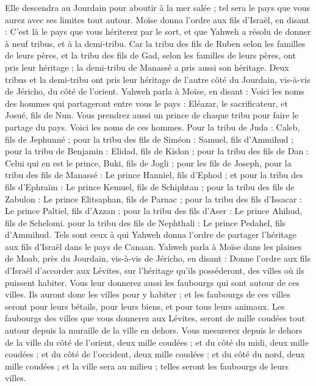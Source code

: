 \begin{multicols}{2}
Elle descendra au Jourdain pour aboutir à la mer salée ; tel sera le pays que vous aurez avec ses limites tout autour.
Moïse donna l'ordre aux fils d'Israël, en disant : C'est là le pays que vous hériterez par le sort, et que Yahweh a résolu de donner à neuf tribus, et à la demi-tribu.
Car la tribu des fils de Ruben selon les familles de leurs pères, et la tribu des fils de Gad, selon les familles de leurs pères, ont pris leur héritage ; la demi-tribu de Manassé a pris aussi son héritage.
Deux tribus et la demi-tribu ont pris leur héritage de l'autre côté du Jourdain, vis-à-vis de Jéricho, du côté de l'orient.
Yahweh parla à Moïse, en disant :
Voici les noms des hommes qui partageront entre vous le pays : Eléazar, le sacrificateur, et Josué, fils de Nun.
Vous prendrez aussi un prince de chaque tribu pour faire le partage du pays.
Voici les noms de ces hommes. Pour la tribu de Juda : Caleb, fils de Jephunné ;
pour la tribu des fils de Siméon : Samuel, fils d'Ammihud ;
pour la tribu de Benjamin : Elidad, fils de Kislon ;
pour la tribu des fils de Dan : Celui qui en est le prince, Buki, fils de Jogli ;
pour les fils de Joseph, pour la tribu des fils de Manassé : Le prince Hanniel, fils d'Ephod ;
et pour la tribu des fils d'Ephraïm : Le prince Kemuel, fils de Schiphtan ;
pour la tribu des fils de Zabulon : Le prince Elitsaphan, fils de Parnac ;
pour la tribu des fils d'Issacar : Le prince Paltiel, fils d'Azzan ;
pour la tribu des fils d'Aser : Le prince Ahihud, fils de Schelomi.
pour la tribu des fils de Nephthali : Le prince Pedahel, fils d'Ammihud.
Tels sont ceux à qui Yahweh donna l'ordre de partager l'héritage aux fils d'Israël dans le pays de Canaan.
\VerseOne{}Yahweh parla à Moïse dans les plaines de Moab, près du Jourdain, vis-à-vis de Jéricho, en disant :
Donne l'ordre aux fils d'Israël d'accorder aux Lévites, sur l'héritage qu'ils posséderont, des villes où ils puissent habiter. Vous leur donnerez aussi les faubourgs qui sont autour de ces villes.
Ils auront donc les villes pour y habiter ; et les faubourgs de ces villes seront pour leurs bétails, pour leurs biens, et pour tous leurs animaux.
Les faubourgs des villes que vous donnerez aux Lévites, seront de mille coudées tout autour depuis la muraille de la ville en dehors.
Vous mesurerez depuis le dehors de la ville du côté de l'orient, deux mille coudées ; et du côté du midi, deux mille coudées ; et du côté de l'occident, deux mille coudées ; et du côté du nord, deux mille coudées ; et la ville sera au milieu ; telles seront les faubourgs de leurs villes.

\end{multicols}
